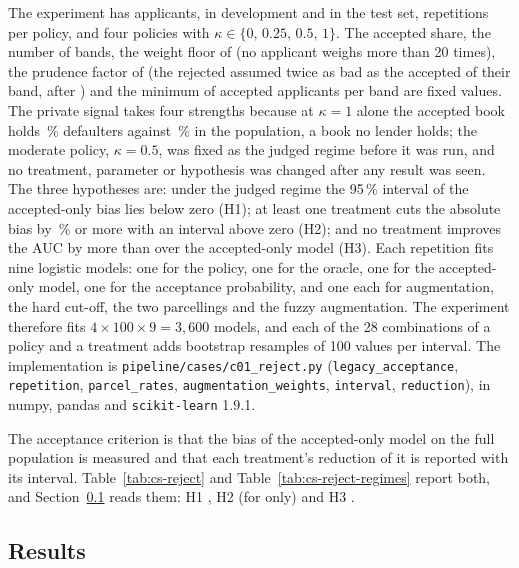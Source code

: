 The experiment has \csRjRows{} applicants, \csRjDev{} in development and \csRjTest{} in the test set, \csRjReps{} repetitions per
policy, and four policies with $\kappa\in\{0,\,0.25,\,0.5,\,1\}$. The accepted share, the number of bands, the weight floor of
\csRjFloor{} (no applicant weighs more than 20 times), the prudence factor of \csRjPrudence{} (the rejected assumed twice as bad
as the accepted of their band, after \citealt{credit-scoring:siddiqi2017}) and the minimum of \csRjMinAcc{} accepted applicants per
band are fixed values. The private signal takes four strengths because at $\kappa=1$ alone the accepted book holds
\csRjStrAccRate{}\,\% defaulters against \csRjMarPop{}\,\% in the population, a book no lender holds; the moderate policy, $\kappa=0.5$,
was fixed as the judged regime before it was run, and no treatment, parameter or hypothesis was changed after any result was seen.
The three hypotheses are: under the judged regime the 95\,\% interval of the accepted-only bias lies below zero (H1); at least one
treatment cuts the absolute bias by \csRjHtwo{}\,\% or more with an interval above zero (H2); and no treatment improves the AUC by
more than \csRjHthree{} over the accepted-only model (H3). Each repetition fits nine logistic models: one for the policy, one for
the oracle, one for the accepted-only model, one for the acceptance probability, and one each for augmentation, the hard cut-off,
the two parcellings and the fuzzy augmentation. The experiment therefore fits $4\times100\times9=3{,}600$ models, and each of the
28 combinations of a policy and a treatment adds \csRjBoot{} bootstrap resamples of 100 values per interval. The implementation is
\texttt{pipeline/cases/c01\_reject.py} (\texttt{legacy\_acceptance}, \texttt{repetition}, \texttt{parcel\_rates},
\texttt{augmentation\_weights}, \texttt{interval}, \texttt{reduction}), in numpy, pandas and \texttt{scikit-learn} 1.9.1.

The acceptance criterion is that the bias of the accepted-only model on the full population is measured and that each treatment's
reduction of it is reported with its interval. Table~\ref{tab:cs-reject} and Table~\ref{tab:cs-reject-regimes} report both, and
Section~\ref{sec:results-credit-scoring} reads them: H1 \csRjHoneHolds{}, H2 \csRjHtwoHolds{} (for \csRjHtwoRung{} only) and
H3 \csRjHthreeHolds{}.

\subsection{Results}
\label{sec:results-credit-scoring}

